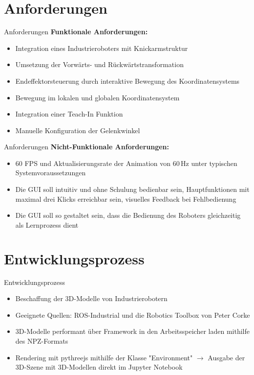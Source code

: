 \documentclass{beamer}
\begin{document}
\section{Anforderungen}

\begin{frame}{Anforderungen}
  \textbf{Funktionale Anforderungen:}\vspace{0.5em}
  \begin{itemize}
    \setlength{\itemsep}{1em}
    \item Integration eines Industrieroboters mit Knickarmstruktur
    \item Umsetzung der Vorwärts- und Rückwärtstransformation
    \item Endeffektorsteuerung durch interaktive Bewegung des Koordinatensystems
    \item Bewegung im lokalen und globalen Koordinatensystem
    \item Integration einer Teach-In Funktion
    \item Manuelle Konfiguration der Gelenkwinkel
  \end{itemize}
\end{frame}



\begin{frame}{Anforderungen}
  \textbf{Nicht-Funktionale Anforderungen:}\vspace{0.5em}
  \begin{itemize}
    \setlength{\itemsep}{1em}
    \item 60 FPS und Aktualisierungsrate der Animation von 60\,Hz unter typischen Systemvoraussetzungen
    \item Die GUI soll intuitiv und ohne Schulung bedienbar sein, Hauptfunktionen mit maximal drei Klicks erreichbar sein, visuelles Feedback bei Fehlbedienung
    \item Die GUI soll so gestaltet sein, dass die Bedienung des Roboters gleichzeitig als Lernprozess dient
  \end{itemize}
\end{frame}



\section{Entwicklungsprozess}
\begin{frame}{Entwicklungsprozess}
  \begin{itemize}
    \setlength{\itemsep}{1em}
    \item Beschaffung der 3D-Modelle von Industrierobotern
    \item Geeignete Quellen: ROS-Industrial und die Robotics Toolbox von Peter Corke
    \item 3D-Modelle performant über Framework in den Arbeitsspeicher laden mithilfe des NPZ-Formats
    \item Rendering mit pythreejs mithilfe der Klasse "Environment" $\to$ Ausgabe der 3D-Szene mit 3D-Modellen direkt im Jupyter Notebook
  \end{itemize}
\end{frame}
\end{document}
